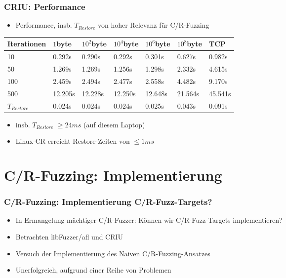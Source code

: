 \documentclass[handout]{beamer}
\begin{document}
\begin{frame}
    \frametitle{CRIU: Performance}
    \begin{itemize}
        \item Performance, insb. $T_{Restore}$ von hoher Relevanz für C/R-Fuzzing
    \end{itemize}

\begin{tabular}{| l | l  l  l  l  l | l |}
    \toprule
    Iterationen & $1$byte & $10^2$byte & $10^4$byte & $10^6$byte & $10^8$byte & TCP \\
    \midrule
    10 & 0.292s & 0.290s & 0.292s & 0.301s & 0.627s & 0.982s \\
    50 & 1.269s & 1.269s & 1.256s & 1.298s & 2.332s & 4.615s \\
    100 & 2.459s & 2.494s & 2.477s & 2.558s & 4.482s & 9.170s \\
    500 & 12.205s & 12.228s & 12.250s & 12.648s & 21.564s & 45.541s \\
    \midrule
    $T_{Restore}$ & 0.024s & 0.024s & 0.024s & 0.025s & 0.043s & 0.091s \\
    \bottomrule
\end{tabular}
    \begin{itemize}
        \item insb. $T_{Restore}$ $\geq 24ms$ (auf diesem Laptop)
        \item Linux-CR erreicht Restore-Zeiten von $\leq 1ms$
    \end{itemize}

\end{frame}

\section{C/R-Fuzzing: Implementierung}
\begin{frame}
    \frametitle{C/R-Fuzzing: Implementierung C/R-Fuzz-Targets?}
    \begin{itemize}
        \item In Ermangelung mächtiger C/R-Fuzzer: Können wir C/R-Fuzz-Targets implementieren?
        \item Betrachten libFuzzer/afl und CRIU
        \item Versuch der Implementierung des Naiven C/R-Fuzzing-Ansatzes
        \item Unerfolgreich, aufgrund einer Reihe von Problemen
    \end{itemize}
\end{frame}
\end{document}
